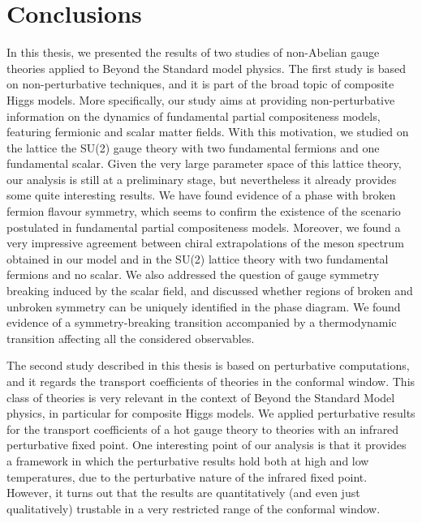 \chapter{Conclusions}


In this thesis, we presented the results of two studies of non-Abelian gauge theories applied to Beyond the Standard model physics. The first study is based on non-perturbative techniques, and it is part of the broad topic of composite Higgs models. More specifically, our study aims at providing non-perturbative information on the dynamics of fundamental partial compositeness models, featuring fermionic and scalar matter fields. With this motivation, we studied on the lattice the SU(2) gauge theory with two fundamental fermions and one fundamental scalar. Given the very large parameter space of this lattice theory, our analysis is still at a preliminary stage, but nevertheless it already provides some quite interesting results. We have found evidence of a phase with broken fermion flavour symmetry, which seems to confirm the existence of the scenario postulated in fundamental partial compositeness models. Moreover, we found a very impressive agreement between chiral extrapolations of the meson spectrum obtained in our model and in the SU(2) lattice theory with two fundamental fermions and no scalar. We also addressed the question of gauge symmetry breaking induced by the scalar field, and discussed whether regions of broken and unbroken symmetry can be uniquely identified in the phase diagram. We found evidence of a symmetry-breaking transition accompanied by a thermodynamic transition affecting all the considered observables.

The second study described in this thesis is based on perturbative computations, and it regards the transport coefficients of theories in the conformal window. This class of theories is very relevant in the context of Beyond the Standard Model physics, in particular for composite Higgs models. We applied perturbative results for the transport coefficients of a hot gauge theory to theories with an infrared perturbative fixed point. One interesting point of our analysis is that it provides a framework in which the perturbative results hold both at high and low temperatures, due to the perturbative nature of the infrared fixed point. However, it turns out that the results are quantitatively (and even just qualitatively) trustable in a very restricted range of the conformal window. 